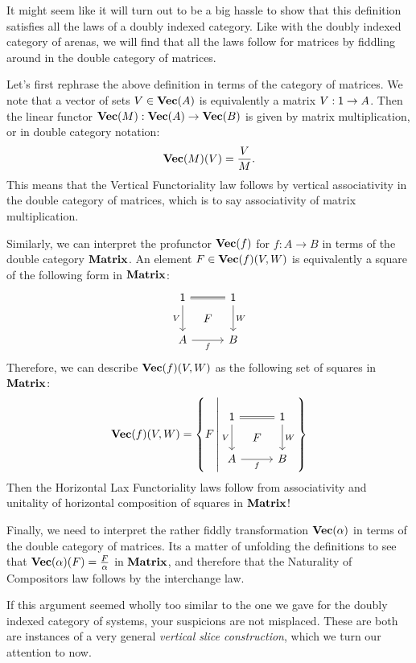 \documentclass[DynamicalBook]{subfiles}
\begin{document}
It might seem like it will turn out to be a big hassle to show that this
definition satisfies all the laws of a doubly indexed category. Like with the
doubly indexed category of arenas, we will find that all the laws follow for
matrices by fiddling around in the double category of matrices.

Let's first rephrase the above definition in terms of the category of matrices.
We note that a vector of sets $V \in \textbf{Vec}(A)$ is equivalently a matrix $V :
\mathsf{1} \to A$. Then the linear functor $\textbf{Vec}(M) : \textbf{Vec}(A) \to
\textbf{Vec}(B)$ is given by matrix multiplication, or in double category notation:
$$\textbf{Vec}(M)(V) = \frac{V}{M}.$$
This means that the Vertical Functoriality law follows by vertical associativity
in the double category of matrices, which is to say associativity of matrix
multiplication.

Similarly, we can interpret the profunctor $\textbf{Vec}(f)$ for $f : A \to B$ in
terms of the double category $\textbf{Matrix}$. An element $F \in \textbf{Vec}(f)(V, W)$ is
equivalently a square of the following form in $\textbf{Matrix}$:
\[
        \begin{tikzcd}[sep=tiny]
          \ord{1} \ar[dd, "V"'] \ar[rr, equals] & & \ord{1} \ar[dd, "W"] \\
           & F & \\
          A \ar[rr, "f"'] & & B
        \end{tikzcd}
      \]
      Therefore, we can describe $\textbf{Vec}(f)(V, W)$ as the following set of squares in $\textbf{Matrix}$:
\[
\Cat{Vec}(f)(V, W) = \left\{ F \,\middle|
        \begin{tikzcd}[sep=tiny]
          \ord{1} \ar[dd, "V"'] \ar[rr, equals] & & \ord{1} \ar[dd, "W"] \\
           & F & \\
          A \ar[rr, "f"'] & & B
        \end{tikzcd}
  \right\}
\]
Then the Horizontal Lax Functoriality laws follow from associativity and unitality of
horizontal composition of squares in $\textbf{Matrix}$! 


Finally, we need to interpret the rather fiddly transformation
$\textbf{Vec}(\alpha)$ in terms of the double category of matrices. Its a matter of
unfolding the definitions to see that
$\textbf{Vec}(\alpha)(F) = \frac{F}{\alpha}$
in $\textbf{Matrix}$, and therefore that the Naturality of Compositors law follows
by the interchange law.

  If this argument seemed wholly too similar to the one we gave for the doubly
  indexed category of systems, your suspicions are not misplaced. These are both are instances of a very general \emph{vertical
    slice construction}, which we turn our attention to now.
\end{document}
